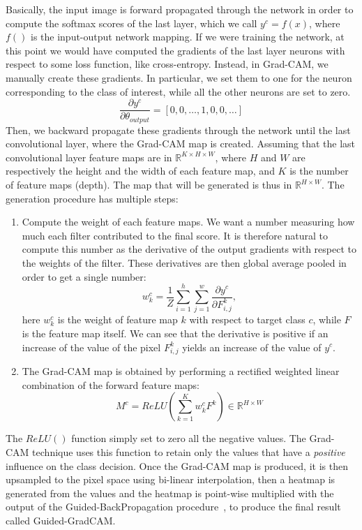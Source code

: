 \documentclass[../main.tex]{subfiles}
\begin{document}
    Basically, the input image is forward propagated through the network in order to compute the softmax scores
    of the last layer, which we call $y^{c} = f(x)$, where $f()$ is the input-output network mapping.
    If we were training the network, at this point we would have computed the gradients of the
    last layer neurons with respect to some loss function, like cross-entropy. Instead, in Grad-CAM, we manually
    create these gradients. In particular, we set them to one for the neuron corresponding to the class of interest,
    while all the other neurons are set to zero.
    $$ \frac{\partial y^{c}}{\partial \theta_{output}} = [0, 0, \ldots , 1, 0, 0, \ldots] $$
    Then, we backward propagate these gradients through the network until
    the last convolutional layer, where the Grad-CAM map is created. Assuming that the last convolutional layer feature maps are
    in $ \mathbb{R}^{K \times H \times W} $, where $H$ and $W$ are respectively the height and the width of each feature
    map, and $K$ is the number of feature maps (depth). The map that will be generated is thus in $\mathbb{R}^{H \times W}$.
    The generation procedure has multiple steps:
    \begin{enumerate}
        \item Compute the weight of each feature maps. We want a number measuring how much each filter contributed to
            the final score. It is therefore natural to compute this number as the derivative of the output gradients
            with respect to the weights of the filter. These derivatives are then global average pooled in order to get
            a single number:
            \begin{equation}
                w_{k}^{c} = \frac{1}{Z} \sum_{i = 1}^{h} \sum_{j = 1}^{w} \frac{\partial y^{c}}{\partial F_{i, j}^{k}},
            \end{equation}
            here $w_{k}^{c}$ is the weight of feature map $k$ with respect to target class $c$, while $F$ is the feature map
            itself. We can see that the derivative is positive if an increase of the value of the pixel $F_{i, j}^{k}$ yields
            an increase of the value of $y^{c}$.
        \item The Grad-CAM map is obtained by performing a rectified weighted linear combination of the forward feature maps:
            \begin{equation}\label{eq:gradcamMaps}
                M^{c} = ReLU \left( \sum_{k = 1}^{K} w_{k}^{c} F^{k} \right) \in \mathbb{R}^{H \times W}
            \end{equation}
    \end{enumerate}
    The $ReLU()$ function simply set to zero all the negative values. The Grad-CAM technique uses this function to retain only
    the values that have a \textit{positive} influence on the class decision.
    Once the Grad-CAM map is produced, it is then upsampled to the pixel space using bi-linear interpolation, then a heatmap
    is generated from the values and the heatmap is point-wise multiplied with the output of the Guided-BackPropagation
    procedure~\cite{guidedbackprop}, to produce the final result called Guided-GradCAM.\@
\end{document}
